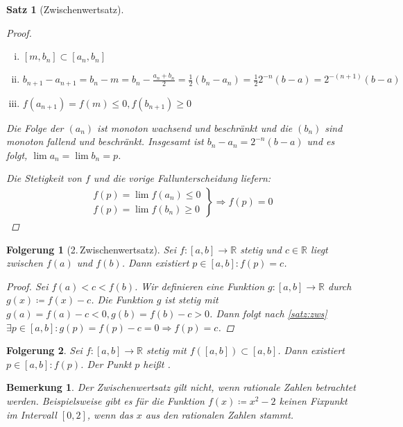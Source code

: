 \documentclass[ngerman,titlepage,twoside, parskip=half*]{scrreprt}
\newcommand*{\R}{\mathbb{R}}
\theoremstyle{break}
\newtheorem{theorem}{Satz}[section]
\newtheorem{Folg}{Folgerung}[chapter]
\theoremstyle{nonumberbreak}
\newtheorem{remark}{Bemerkung}
\newtheorem{proof}{Beweis:}
\newcommand*{\highl}[2][]{\textbf{\boldmath{#2}}%
  \ifthenelse{\equal{#1}{}}{\index{#2}}{\index{#1}}%
}
\begin{document}
\begin{theorem}[Zwischenwertsatz]
\begin{proof}
\begin{enumerate}[1.\,F{a}ll]
    \begin{enumerate}[(i)]
    \item $[m,b_{n}]\subset [a_n,b_n]$
    \item $b_{n+1}-a_{n+1} = b_n-m = b_n-\frac{a_n+b_n}{2} =
      \frac{1}{2}(b_n-a_n) = \frac{1}{2}2^{-n}(b-a) =2^{-(n+1)}(b-a)$
    \item $f(a_{n+1})=f(m)\leq 0, f(b_{n+1})\geq 0$
    \end{enumerate}
  \end{enumerate}
  Die Folge der $(a_n)$ ist monoton wachsend und beschränkt und die
  $(b_n)$ sind monoton fallend und beschränkt. Insgesamt ist
  $b_n-a_n=2^{-n}(b-a)$ und es folgt, $\lim a_n=\lim b_n=p$.

  Die Stetigkeit von $f$ und die vorige Fallunterscheidung liefern:
  \begin{gather*}
   \left.\begin{array}{rcl}
      f(p)=\lim f(a_n)\leq 0\\
      f(p)=\lim f(b_n)\geq 0
    \end{array}\right\}\Rightarrow f(p)=0 
  \end{gather*}
\end{proof}
\end{theorem}

\begin{Folg}[2.\,Zwischenwertsatz]
  Sei $f\colon[a,b]\rightarrow\R$ stetig und $c\in \R$ liegt zwischen
  $f(a)$ und $f(b)$. Dann existiert $p\in[a,b]\colon f(p)=c$.
  \begin{proof}
    Sei $f(a)<c<f(b)$. Wir definieren eine Funktion
    $g\colon[a,b]\rightarrow \R$ durch $g(x)\coloneqq f(x)-c$. Die
    Funktion $g$ ist stetig mit $g(a)=f(a)-c<0, g(b)=f(b)-c>0$. Dann
    folgt nach \autoref{satz:zws} $\exists p\in[a,b] \colon
    g(p)=f(p)-c=0\Rightarrow f(p)=c$.
  \end{proof}
\end{Folg}

\begin{Folg}
  Sei $f\colon[a,b]\rightarrow\R$ stetig mit $f([a,b])\subset
  [a,b]$. Dann existiert $p\in [a,b]\colon f(p)$. Der Punkt $p$ heißt
  \highl{Fixpunkt}.
\end{Folg}

\begin{remark}
  Der Zwischenwertsatz gilt nicht, wenn rationale Zahlen betrachtet
  werden. Beispielsweise gibt es für die Funktion $f(x)\coloneqq
  x^2-2$ keinen Fixpunkt im Intervall $[0,2]$, wenn das $x$ aus den
  rationalen Zahlen stammt.
\end{remark}
\end{document}
